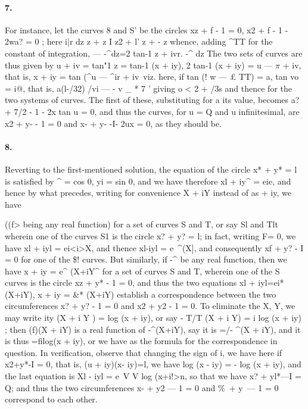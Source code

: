 \documentclass[11pt,a4paper]{book}
\begin{document}
{{{{{{\paragraph{7.} For  instance,  let  the  curves  8  and  S'  be  the  circles
xz  +  f  -  1  =  0,     x2  +  f  - 1  -  2wa?  =  0 ;
here
i|r  dz      z  +  z  I      z2  +  l'
z  +  -
z
whence,  adding  ^TT  for  the  constant  of  integration,
---  -^dz=2  tan-1  z  +  ivr.
-^  dz
The  two  sets  of  curves  are  thus  given  by
u  +  iv  =  tan"1  z  =  tan-1  (x  +  iy),     2  tan-1  (x  +  iy)  =  u  ---  $\pi$  +  iv,
that  is,
x  +  iy  =  tan  (^u  ---  ^ir  +  iv\
viz.  here,  if
tan  (!  w  ---   £   TT)  =  a,     tan  vo  =  i@,
that  is,
a(l-/32)
/vi    ---  -  v  \_  *         7 '
giving
o      < 2  +  /3s
and  thence
for  the  two  systems  of  curves.     The  first  of  these,  substituting  for  a  its  value,  becomes
a?  +  7/2  -  1  -  2x  tan  u  =  0,
and  thus  the  curves,  for  u  =  Q  and  u  infinitesimal,  are
x2  +  y-  -  1  =  0     and     x-  +  y-  -I-  2ux  =  0,
as  they  should  be.
\paragraph{8.} Reverting  to  the  first-mentioned  solution,  the  equation  of  the  circle  x*  +  y*  =  l
is  satisfied  by  ^  =  cos  0,  yi  =  sin  0,  and  we  have  therefore  xl  +  iy^  =  eie,  and  hence  by
what  precedes,  writing  for  convenience  X  +  iY  instead  of  as  +  iy,  we  have


((f>  being  any  real  function)  for  a  set  of  curves  S  and  T,  or  say  Sl  and  Tlt  wherein
one  of  the  curves  S1  is  the  circle  x?  +  y?  =  l;  in  fact,  writing  F=  0,  we  have
xl  +  iyl  =  ei<i>{X},  and  thence  xl-iyl  =  e~^(X],  and  consequently  xf  +  y?  -  I  =  0  for  one
of  the  \$!  curves.
But  similarly,  if  -^  be  any  real  function,  then  we  have  x  +  iy  =  e^  (X+iY^  for  a
set  of  curves  S  and  T,  wherein  one  of  the  S  curves  is  the  circle  xz  +  y*  -  1  =  0,  and
thus  the  two  equations  xl  +  iyl=ei*(X+iY),  x  +  iy  =  \&*  (X+iY)  establish  a  correspondence
between  the  two  circumferences  x?  +  y?  -  1  =  0  and  x2  +  y2  -  1  =  0.  To  eliminate  the
X,   Y,  we  may  write
ity  (X  +  i  Y  )  =    log  (x  +  iy),
or  say
-  T/T  (X  +  i  Y)  =  i  log  (x  +  iy)  ;
then    (f)(X  +  iY)   is   a   real   function    of   -^(X+iY),   say   it   is    =/{-  ^(X  +  iY)},  and
it  is  thus  =f{ilog(x  +  iy)},  or  we  have
as  the  formula  for  the  correspondence  in  question.     In  verification,  observe  that  changing
the  sign  of  i,  we  have
here  if  x2+y*-I  =  0,  that  is,  (u  +  iy)(x-  iy)=l,  we  have
log  (x  -  iy)  =  -  log  (x  +  iy),
and  the  last  equation  is
Xl  -  iyl  =  e~V  V  log  (x+i!>n,
so   that   we   have   x?  +  yl*---I  =  Q;    and    thus   the   two   circumferences   x-  +  y2  ---  1  =  0    and
\%\  +  y\  ---  1  =  0  correspond  to  each  other.
}}}}}}
\end{document}
